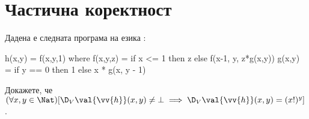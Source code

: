 \section{Частична коректност}

\begin{problem}
  Дадена е следната програма на езика \REC:
  
  \begin{haskellcode}
h(x,y) = f(x,y,1) where
  f(x,y,z) = if x <= 1 then z 
               else f(x-1, y, z*g(x,y))
  g(x,y) = if y == 0 then 1 
             else x * g(x, y - 1)
  \end{haskellcode}
  
  Докажете, че $(\forall x,y\in\Nat)[\D_V\val{\vv{h}}(x,y) \neq \bot \implies \D_V\val{\vv{h}}(x,y) = (x!)^y]$.
\end{problem}
